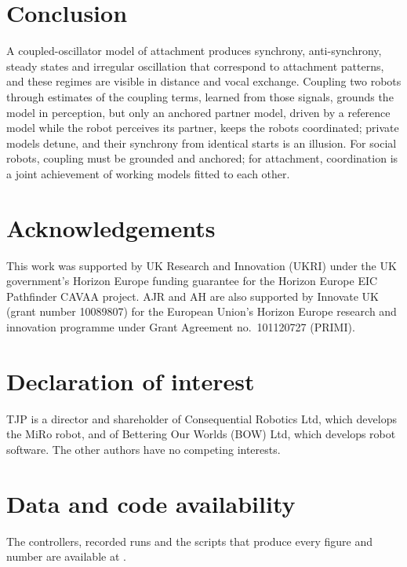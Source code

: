 \documentclass[journal]{IEEEtran}
\newif\ifdraftmarkers
\newcommand{\authornote}[1]{\ifdraftmarkers\textcolor{blue}{\textit{[Authors: #1]}}\fi}
\begin{document}
\section{Conclusion}
A coupled-oscillator model of attachment produces synchrony, anti-synchrony, steady states and irregular oscillation that correspond to attachment patterns, and these regimes are visible in distance and vocal exchange. Coupling two robots through estimates of the coupling terms, learned from those signals, grounds the model in perception, but only an anchored partner model, driven by a reference model while the robot perceives its partner, keeps the robots coordinated; private models detune, and their synchrony from identical starts is an illusion. For social robots, coupling must be grounded and anchored; for attachment, coordination is a joint achievement of working models fitted to each other.

\section*{Acknowledgements}
This work was supported by UK Research and Innovation (UKRI) under the UK government's Horizon Europe funding guarantee for the Horizon Europe EIC Pathfinder CAVAA project. AJR and AH are also supported by Innovate UK (grant number 10089807) for the European Union's Horizon Europe research and innovation programme under Grant Agreement no.~101120727 (PRIMI). \authornote{check that the funding statement is current}

\section*{Declaration of interest}
TJP is a director and shareholder of Consequential Robotics Ltd, which develops the MiRo robot, and of Bettering Our Worlds (BOW) Ltd, which develops robot software. The other authors have no competing interests.

\section*{Data and code availability}
The controllers, recorded runs and the scripts that produce every figure and number are available at \authornote{repository URL}.



\end{document}
